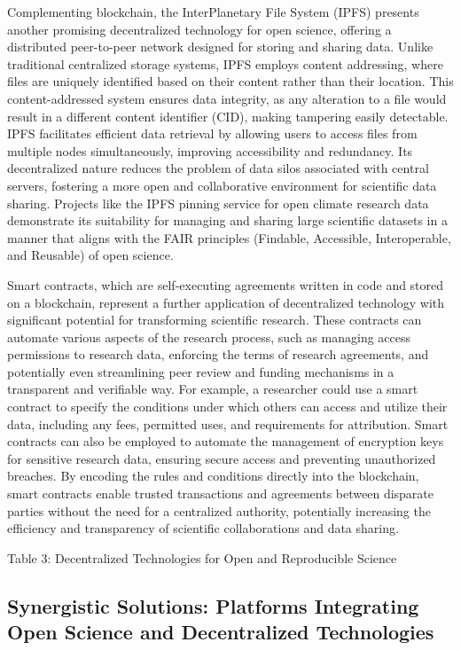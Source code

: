 \documentclass{article}
\begin{document}
Complementing blockchain, the InterPlanetary File System (IPFS) presents another promising decentralized technology for open science, offering a distributed peer-to-peer network designed for storing and sharing data. Unlike traditional centralized storage systems, IPFS employs content addressing, where files are uniquely identified based on their content rather than their location. This content-addressed system ensures data integrity, as any alteration to a file would result in a different content identifier (CID), making tampering easily detectable. IPFS facilitates efficient data retrieval by allowing users to access files from multiple nodes simultaneously, improving accessibility and redundancy. Its decentralized nature reduces the problem of data silos associated with central servers, fostering a more open and collaborative environment for scientific data sharing. Projects like the IPFS pinning service for open climate research data demonstrate its suitability for managing and sharing large scientific datasets in a manner that aligns with the FAIR principles (Findable, Accessible, Interoperable, and Reusable) of open science.

Smart contracts, which are self-executing agreements written in code and stored on a blockchain, represent a further application of decentralized technology with significant potential for transforming scientific research. These contracts can automate various aspects of the research process, such as managing access permissions to research data, enforcing the terms of research agreements, and potentially even streamlining peer review and funding mechanisms in a transparent and verifiable way. For example, a researcher could use a smart contract to specify the conditions under which others can access and utilize their data, including any fees, permitted uses, and requirements for attribution. Smart contracts can also be employed to automate the management of encryption keys for sensitive research data, ensuring secure access and preventing unauthorized breaches. By encoding the rules and conditions directly into the blockchain, smart contracts enable trusted transactions and agreements between disparate parties without the need for a centralized authority, potentially increasing the efficiency and transparency of scientific collaborations and data sharing.

Table 3: Decentralized Technologies for Open and Reproducible Science

\subsection{Synergistic Solutions: Platforms Integrating Open Science and Decentralized Technologies}
\end{document}
